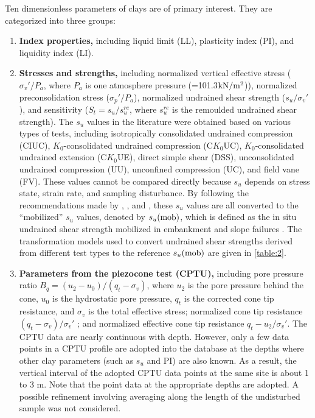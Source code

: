     
\begin{paracol}{2}
    
    Ten dimensionless parameters of clays are of primary interest. They are categorized into three groups:
    \begin{enumerate}
        \item \textbf{Index properties,} including liquid limit (LL), plasticity index (PI), and liquidity index (LI). 
        
        \item \textbf{Stresses and strengths,} including normalized vertical effective stress ($\sigma_v'/P_a$, where $P_a$ is one atmosphere pressure (=101.3$\rm{kN/m^2}$)), normalized preconsolidation stress ($\sigma_p'/P_a$), normalized undrained shear strength ($s_u/\sigma_v'$), and sensitivity ($S_t=s_u/s_u^{re}$, where $s_u^{re}$ is the remoulded undrained shear strength). The $s_u$ values in the literature were obtained based on various types of tests, including isotropically consolidated undrained compression (CIUC), $K_0$-consolidated undrained compression (C$K_0$UC), $K_0$-consolidated undrained extension (C$K_0$UE), direct simple shear (DSS), unconsolidated undrained compression (UU), unconfined compression (UC), and field vane (FV). These values cannot be compared directly because $s_u$ depends on stress state, strain rate, and sampling disturbance. By following the recommendations made by \citet{Bjerrum19721}, \citet{Kulhawy1990}, and \citet{Mesri20071}, these $s_u$ values are all converted to the “mobilized” $s_u$ values, denoted by $s_u(\rm{mob})$, which is defined as the in situ undrained shear strength mobilized in embankment and slope failures \citep{Mesri20071}. The transformation models used to convert undrained shear strengths derived from different test types to the reference $s_u(\rm{mob})$ are given in \autoref{table:2}. 
        
        \item \textbf{Parameters from the piezocone test (CPTU),} including pore pressure ratio $B_q=(u_2-u_0)/(q_t-\sigma_v)$, where $u_2$ is the pore pressure behind the cone, $u_0$ is the hydrostatic pore pressure, $q_t$ is the corrected cone tip resistance, and $\sigma_v$ is the total effective stress; normalized cone tip resistance $(q_t-\sigma_v)/\sigma_v'$ ; and normalized effective cone tip resistance $q_t-u_2/\sigma_v'$. 
        The CPTU data are nearly continuous with depth. However, only a few data points in a CPTU profile are adopted into the database at the depths where other clay parameters (such as $s_u$ and PI) are also known. As a result, the vertical interval of the adopted CPTU data points at the same site is about 1 to 3 m. Note that the point data at the appropriate depths are adopted. A possible refinement involving averaging along the length of the undisturbed sample was not considered.
    \end{enumerate}


\end{paracol}
